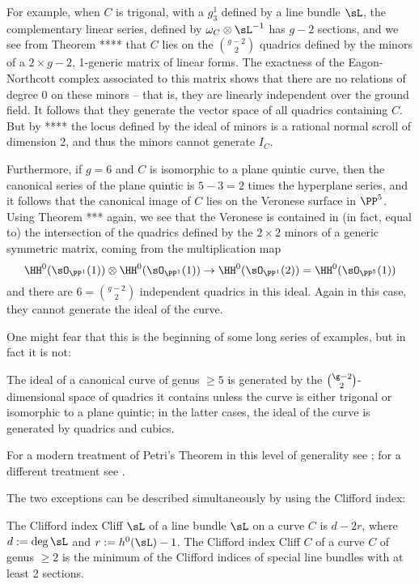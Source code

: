  For example,
when $C$ is trigonal, with a $g^{1}_{3}$ defined by a line bundle $\sL$, the complementary linear series,
defined by $\omega_{C}\otimes \sL^{-1}$ has $g-2$ sections, and we see from Theorem ****
that $C$ lies on the ${g-2\choose 2}$ quadrics defined by the minors of a $2\times g-2$, 1-generic matrix of linear forms. The exactness of the Eagon-Northcott complex associated to this matrix shows that there are no relations of degree 0 on these minors -- that is, they are linearly independent over the ground field. It follows that they generate the vector space of all quadrics containing $C$. But by **** the locus defined by
the ideal of minors is a rational normal scroll of dimension 2, and thus the minors cannot generate $I_{C}$.

Furthermore, if $g = 6$ and $C$ is isomorphic to a plane quintic curve, then the canonical series of the plane quintic is $5-3 = 2$ times the hyperplane series, and it follows that the canonical image of $C$ lies on the Veronese surface in $\PP^{5}$. Using Theorem *** again, we see that the Veronese is contained in (in fact, equal to) the intersection of the quadrics defined by the $2\times 2$ minors of a generic symmetric matrix, coming from the 
multiplication map 
$$
\HH^{0}(\sO_{\PP^{1}}(1))\otimes \HH^{0}(\sO_{\PP^{1}}(1)) \to \HH^{0}(\sO_{\PP^{1}}(2)) = \HH^{0}(\sO_{\PP^{5}}(1))
$$
and there are $6 = {g-2\choose 2}$ independent quadrics in this ideal. Again in this case, they cannot generate the ideal of the curve.

One might fear that this is the beginning of some long series of examples, but in fact it is not: 

\begin{theorem} [Petri]
The ideal of a canonical curve of genus $\geq 5$ is generated by the $\g-2\choose 2$-dimensional space of quadrics it contains unless the curve is either trigonal or isomorphic to a plane quintic; in the latter cases, the ideal of the curve is generated by quadrics and cubics.
\end{theorem}

For a modern treatment of Petri's Theorem in this level of generality see \cite{Schreyer}; for a different treatment see \cite{Arbarello-Sernesi}.

The two exceptions can be described simultaneously by using the Clifford index:

\begin{definition}
 The Clifford index Cliff $\sL$ of a line bundle $\sL$ on a curve $C$ is $d-2r$, where $d := \deg \sL$ and $r :=  h^0(\sL)-1$. The Clifford index Cliff $C$ of
 a curve $C$ of genus $\geq 2$ is the minimum of the Clifford indices of special line bundles with at least 2 sections.
\end{definition}

